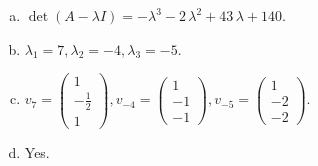 \begin{questions}
\begin{solution}
\begin{enumerate}[(a)]
\item $\det(A-\lambda I)=-{\lambda}^{3} - 2 \, {\lambda}^{2} + 43 \, {\lambda} + 140$.
\item ${\lambda}_1=7, {\lambda}_2=-4, {\lambda}_3=-5$.
\item $v_{7}=\left(\begin{array}{r}
1 \\
-\frac{1}{2} \\
1
\end{array}\right), v_{-4}=\left(\begin{array}{r}
1 \\
-1 \\
-1
\end{array}\right), v_{-5}=\left(\begin{array}{r}
1 \\
-2 \\
-2
\end{array}\right)$.
\item Yes.
\end{enumerate}
\end{solution}

\end{questions}

\newpage


\begin{center}
\end{center}

